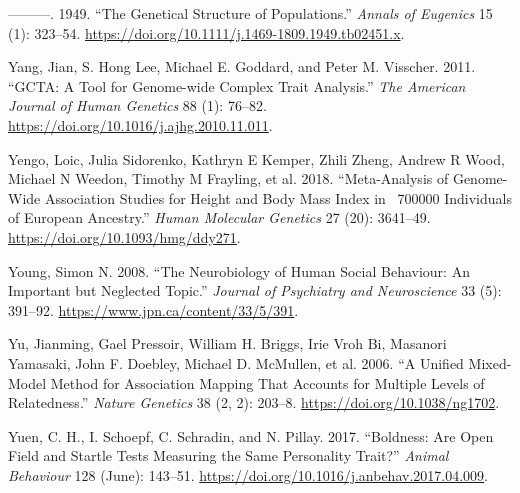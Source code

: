 \documentclass[
]{book}
\newlength{\cslhangindent}
\newlength{\cslentryspacingunit} %
\newenvironment{CSLReferences}[2] %
 {%
  \setlength{\parindent}{0pt}
  \ifodd #1
  \let\oldpar\par
  \def\par{\hangindent=\cslhangindent\oldpar}
  \fi
  \setlength{\parskip}{#2\cslentryspacingunit}
 }%
 {}
\begin{document}
\begin{CSLReferences}{1}{0}
\leavevmode{}%
---------. 1949. {``The {Genetical Structure} of {Populations}.''} \emph{Annals of Eugenics} 15 (1): 323--54. \url{https://doi.org/10.1111/j.1469-1809.1949.tb02451.x}.

\leavevmode{}%
Yang, Jian, S. Hong Lee, Michael E. Goddard, and Peter M. Visscher. 2011. {``{GCTA}: {A Tool} for {Genome-wide Complex Trait Analysis}.''} \emph{The American Journal of Human Genetics} 88 (1): 76--82. \url{https://doi.org/10.1016/j.ajhg.2010.11.011}.

\leavevmode{}%
Yengo, Loic, Julia Sidorenko, Kathryn E Kemper, Zhili Zheng, Andrew R Wood, Michael N Weedon, Timothy M Frayling, et al. 2018. {``Meta-Analysis of Genome-Wide Association Studies for Height and Body Mass Index in ~700000 Individuals of {European} Ancestry.''} \emph{Human Molecular Genetics} 27 (20): 3641--49. \url{https://doi.org/10.1093/hmg/ddy271}.

\leavevmode{}%
Young, Simon N. 2008. {``The Neurobiology of Human Social Behaviour: An Important but Neglected Topic.''} \emph{Journal of Psychiatry and Neuroscience} 33 (5): 391--92. \url{https://www.jpn.ca/content/33/5/391}.

\leavevmode{}%
Yu, Jianming, Gael Pressoir, William H. Briggs, Irie Vroh Bi, Masanori Yamasaki, John F. Doebley, Michael D. McMullen, et al. 2006. {``A Unified Mixed-Model Method for Association Mapping That Accounts for Multiple Levels of Relatedness.''} \emph{Nature Genetics} 38 (2, 2): 203--8. \url{https://doi.org/10.1038/ng1702}.

\leavevmode{}%
Yuen, C. H., I. Schoepf, C. Schradin, and N. Pillay. 2017. {``Boldness: Are Open Field and Startle Tests Measuring the Same Personality Trait?''} \emph{Animal Behaviour} 128 (June): 143--51. \url{https://doi.org/10.1016/j.anbehav.2017.04.009}.

\end{CSLReferences}
\end{document}
